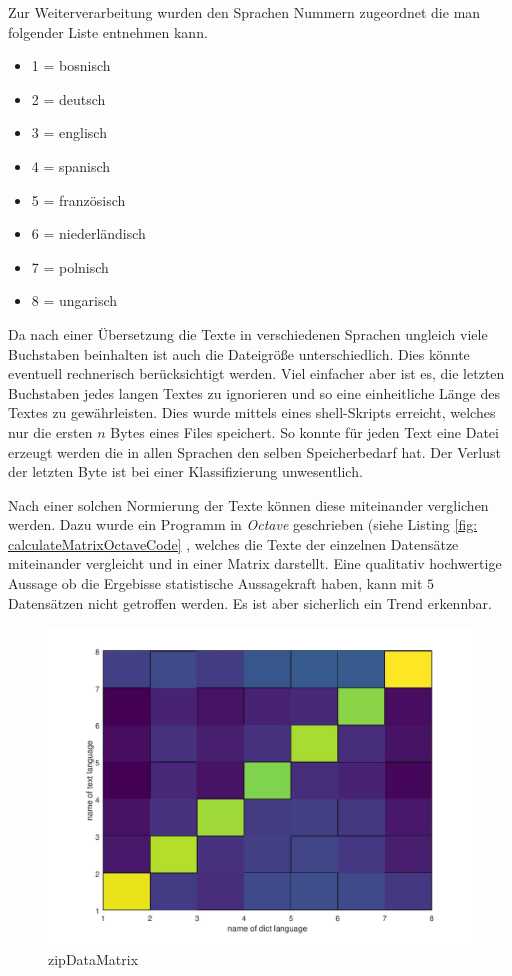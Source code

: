 \documentclass[12pt,german]{article}
\begin{document}
Zur Weiterverarbeitung wurden den Sprachen Nummern zugeordnet die man folgender Liste entnehmen kann.

\begin{itemize}
	\item 1 = bosnisch
	\item 2 = deutsch
	\item 3 = englisch
	\item 4 = spanisch
	\item 5 = französisch
	\item 6 = niederländisch
	\item 7 = polnisch
	\item 8 = ungarisch
\end{itemize}

Da nach einer Übersetzung die Texte in verschiedenen Sprachen ungleich viele Buchstaben beinhalten ist auch die Dateigröße unterschiedlich. Dies könnte eventuell rechnerisch berücksichtigt werden. Viel einfacher aber ist es, die letzten Buchstaben jedes langen Textes zu ignorieren und so eine einheitliche Länge des Textes zu gewährleisten. Dies wurde mittels eines shell-Skripts erreicht, welches nur die ersten $n$ Bytes eines Files speichert. So konnte für jeden Text eine Datei erzeugt werden die in allen Sprachen den selben Speicherbedarf hat. Der Verlust der letzten Byte ist bei einer Klassifizierung unwesentlich. 



Nach einer solchen Normierung der Texte können diese miteinander verglichen werden. Dazu wurde ein Programm in \textit{Octave} geschrieben (siehe Listing \ref{fig: calculateMatrixOctaveCode}  , welches die Texte der einzelnen Datensätze miteinander vergleicht und in einer Matrix darstellt. Eine qualitativ hochwertige Aussage ob die Ergebisse statistische Aussagekraft haben, kann mit $5$ Datensätzen nicht getroffen werden. Es ist aber sicherlich ein Trend erkennbar.


\begin{figure}[H]
	\centering
	\includegraphics[width=12cm]{images/resultZipData.jpg}
	\caption{zipDataMatrix}
	\label{fig: zipDataMatrix}
\end{figure}
\end{document}
